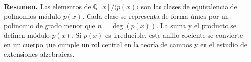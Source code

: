 \noindent
\textbf{Resumen.} Los elementos de \(\mathbb{Q}[x]/\langle p(x)\rangle\) son las clases de equivalencia 
de polinomios módulo \(p(x)\). Cada clase se representa de forma única por un polinomio de grado 
menor que \(n = \deg(p(x))\). La suma y el producto se definen módulo \(p(x)\). 
Si \(p(x)\) es irreducible, este anillo cociente se convierte en un cuerpo 
que cumple un rol central en la teoría de campos y en el estudio de extensiones algebraicas.

